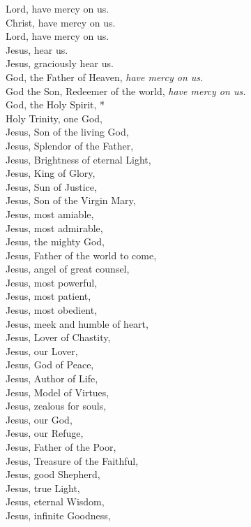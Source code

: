 \documentclass[9pt]{article}
\begin{document}
\begin{multicols}{3}
Lord, have mercy on us.\\
Christ, have mercy on us.\\
Lord, have mercy on us.\\
Jesus, hear us.\\
Jesus, graciously hear us.\\
God, the Father of Heaven, \textit{have mercy on us.}\\
God the Son, Redeemer of the world, \textit{have mercy on us.}\\
God, the Holy Spirit, *\\
Holy Trinity, one God,\\
Jesus, Son of the living God,\\
Jesus, Splendor of the Father,\\
Jesus, Brightness of eternal Light,\\
Jesus, King of Glory,\\
Jesus, Sun of Justice,\\
Jesus, Son of the Virgin Mary,\\
Jesus, most amiable,\\
Jesus, most admirable,\\ 
Jesus, the mighty God,\\
Jesus, Father of the world to come,\\ 
Jesus, angel of great counsel,\\
Jesus, most powerful,\\
Jesus, most patient,\\
Jesus, most obedient,\\
Jesus, meek and humble of heart,\\ 
Jesus, Lover of Chastity,\\
Jesus, our Lover,\\
Jesus, God of Peace,\\ 
Jesus, Author of Life,\\ 
Jesus, Model of Virtues,\\ 
Jesus, zealous for souls,\\
Jesus, our God,\\
Jesus, our Refuge,\\ 
Jesus, Father of the Poor,\\ 
Jesus, Treasure of the Faithful,\\
Jesus, good Shepherd,\\
Jesus, true Light,\\
Jesus, eternal Wisdom,\\ 
Jesus, infinite Goodness,\\ 

\end{multicols}
\end{document}
